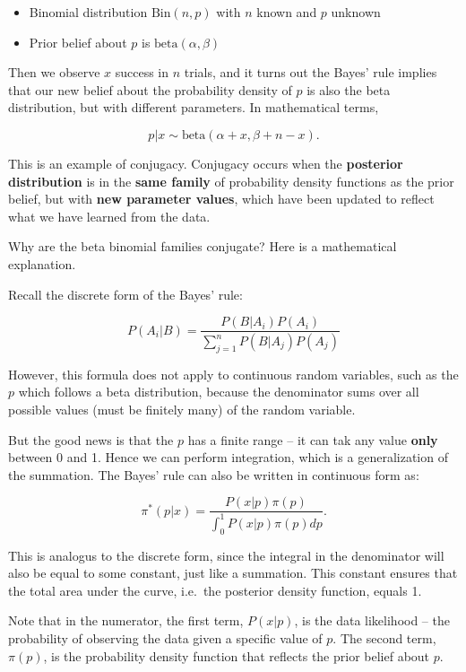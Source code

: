 \documentclass[]{book}
\theoremstyle{definition}
\theoremstyle{definition}
\theoremstyle{definition}
\theoremstyle{remark}
\begin{document}
\begin{itemize}
\item
  Binomial distribution \(\text{Bin}(n,p)\) with \(n\) known and \(p\)
  unknown
\item
  Prior belief about \(p\) is \(\text{beta}(\alpha,\beta)\)
\end{itemize}

Then we observe \(x\) success in \(n\) trials, and it turns out the
Bayes' rule implies that our new belief about the probability density of
\(p\) is also the beta distribution, but with different parameters. In
mathematical terms,

\begin{equation}
p|x \sim \text{beta}(\alpha+x, \beta+n-x).
\label{eq:beta-binomial}
\end{equation}

This is an example of conjugacy. Conjugacy occurs when the
\textbf{posterior distribution} is in the \textbf{same family} of
probability density functions as the prior belief, but with \textbf{new
parameter values}, which have been updated to reflect what we have
learned from the data.

Why are the beta binomial families conjugate? Here is a mathematical
explanation.

Recall the discrete form of the Bayes' rule:

\[P(A_i|B) = \frac{P(B|A_i)P(A_i)}{\sum^n_{j=1}P(B|A_j)P(A_j)}\]

However, this formula does not apply to continuous random variables,
such as the \(p\) which follows a beta distribution, because the
denominator sums over all possible values (must be finitely many) of the
random variable.

But the good news is that the \(p\) has a finite range -- it can tak any
value \textbf{only} between 0 and 1. Hence we can perform integration,
which is a generalization of the summation. The Bayes' rule can also be
written in continuous form as:

\[\pi^*(p|x) = \frac{P(x|p)\pi(p)}{\int^1_0 P(x|p)\pi(p) dp}.\]

This is analogus to the discrete form, since the integral in the
denominator will also be equal to some constant, just like a summation.
This constant ensures that the total area under the curve, i.e.~the
posterior density function, equals 1.

Note that in the numerator, the first term, \(P(x|p)\), is the data
likelihood -- the probability of observing the data given a specific
value of \(p\). The second term, \(\pi(p)\), is the probability density
function that reflects the prior belief about \(p\).
\end{document}

